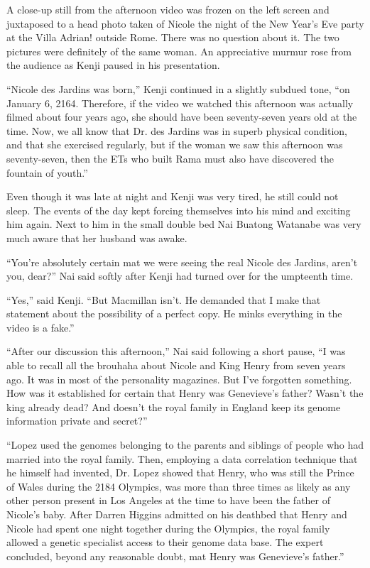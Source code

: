 \documentclass[]{article}
\begin{document}
{A close-up still from the afternoon video was frozen on the left screen and juxtaposed to a head photo taken of Nicole the night of the New Year’s Eve party at the Villa Adrian! outside Rome. There was no question about it. The two pictures were definitely of the same woman. An appreciative murmur rose from the audience as Kenji paused in his presentation.

“Nicole des Jardins was born,” Kenji continued in a slightly subdued tone, “on January 6, 2164. Therefore, if the video we watched this afternoon was actually filmed about four years ago, she should have been seventy-seven years old at the time. Now, we all know that Dr. des Jardins was in superb physical condition, and that she exercised regularly, but if the woman we saw this afternoon was seventy-seven, then the ETs who built Rama must also have discovered the fountain of youth.”

Even though it was late at night and Kenji was very tired, he still could not sleep. The events of the day kept forcing themselves into his mind and exciting him again. Next to him in the small double bed Nai Buatong Watanabe was very much aware that her husband was awake.

“You’re absolutely certain mat we were seeing the real Nicole des Jardins, aren’t you, dear?” Nai said softly after Kenji had turned over for the umpteenth time.

“Yes,” said Kenji. “But Macmillan isn’t. He demanded that I make that statement about the possibility of a perfect copy. He minks everything in the video is a fake.”

“After our discussion this afternoon,” Nai said following a short pause, “I was able to recall all the brouhaha about Nicole and King Henry from seven years ago. It was in most of the personality magazines. But I’ve forgotten something. How was it established for certain that Henry was Genevieve’s father? Wasn’t the king already dead? And doesn’t the royal family in England keep its genome information private and secret?”

“Lopez used the genomes belonging to the parents and siblings of people who had married into the royal family. Then, employing a data correlation technique that he himself had invented, Dr. Lopez showed that Henry, who was still the Prince of Wales during the 2184 Olympics, was more than three times as likely as any other person present in Los Angeles at the time to have been the father of Nicole’s baby. After Darren Higgins admitted on his deathbed that Henry and Nicole had spent one night together during the Olympics, the royal family allowed a genetic specialist access to their genome data base. The expert concluded, beyond any reasonable doubt, mat Henry was Genevieve’s father.”

}
\end{document}
